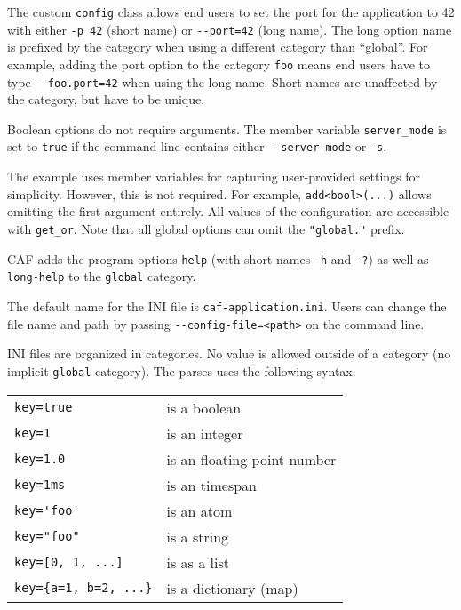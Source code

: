 The custom \lstinline^config^ class allows end users to set the port for the
application to 42 with either \lstinline^-p 42^ (short name) or
\lstinline^--port=42^ (long name). The long option name is prefixed by the
category when using a different category than ``global''. For example, adding
the port option to the category \lstinline^foo^ means end users have to type
\lstinline^--foo.port=42^ when using the long name. Short names are unaffected
by the category, but have to be unique.

Boolean options do not require arguments. The member variable
\lstinline^server_mode^ is set to \lstinline^true^ if the command line contains
either \lstinline^--server-mode^ or \lstinline^-s^.

The example uses member variables for capturing user-provided settings for
simplicity. However, this is not required. For example,
\lstinline^add<bool>(...)^ allows omitting the first argument entirely. All
values of the configuration are accessible with \lstinline^get_or^. Note that
all global options can omit the \lstinline^"global."^ prefix.

CAF adds the program options \lstinline^help^ (with short names \lstinline^-h^
and \lstinline^-?^) as well as \lstinline^long-help^ to the \lstinline^global^
category.

The default name for the INI file is \lstinline^caf-application.ini^. Users can
change the file name and path by passing \lstinline^--config-file=<path>^ on the
command line.

INI files are organized in categories. No value is allowed outside of a category
(no implicit \lstinline^global^ category). The parses uses the following syntax:

\begin{tabular}{ll}
  \lstinline^key=true^ & is a boolean \\
  \lstinline^key=1^ & is an integer \\
  \lstinline^key=1.0^ & is an floating point number \\
  \lstinline^key=1ms^ & is an timespan \\
  \lstinline^key='foo'^ & is an atom \\
  \lstinline^key="foo"^ & is a string \\
  \lstinline^key=[0, 1, ...]^ & is as a list \\
  \lstinline^key={a=1, b=2, ...}^ & is a dictionary (map) \\
\end{tabular}

